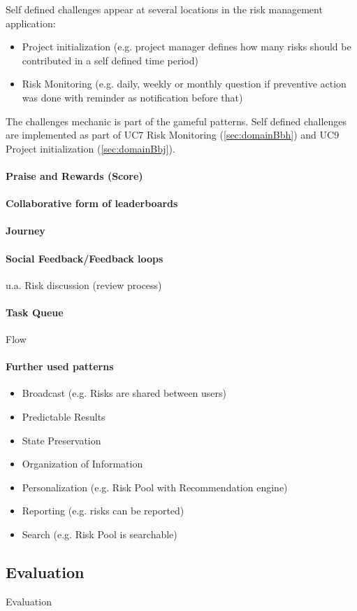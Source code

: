 Self defined challenges appear at several locations in the risk management application:
\begin{itemize}
	\item Project initialization (e.g. project manager defines how many risks should be contributed in a self defined time period)
	\item Risk Monitoring (e.g. daily, weekly or monthly question if preventive action was done with reminder as notification before that)
\end{itemize}

The challenges mechanic is part of the gameful patterns. 
Self defined challenges are implemented as part of \ac{UC}7 Risk Monitoring (\ref{sec:domainBbh}) and \ac{UC}9 Project initialization (\ref{sec:domainBbj}).

\paragraph*{Praise and Rewards (Score)}

\paragraph*{Collaborative form of leaderboards}

\paragraph*{Journey}

\paragraph*{Social Feedback/Feedback loops}

u.a. Risk discussion (review process)

\paragraph*{Task Queue}

Flow

\paragraph*{Further used patterns}

\begin{itemize}
	\item Broadcast (e.g. Risks are shared between users)
	\item Predictable Results
	\item State Preservation
	\item Organization of Information
	\item Personalization (e.g. Risk Pool with Recommendation engine)
	\item Reporting (e.g. risks can be reported)
	\item Search (e.g. Risk Pool is searchable)
\end{itemize}


\subsection{Evaluation}
\label{sec:domainCd}
Evaluation
